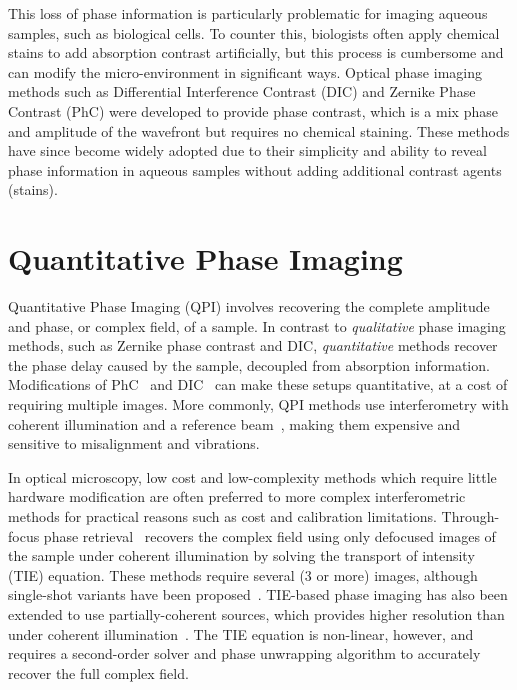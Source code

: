 This loss of phase information is particularly problematic for imaging aqueous samples, such as biological cells. To counter this, biologists often apply chemical stains to add absorption contrast artificially, but this process is cumbersome and can modify the micro-environment in significant ways. Optical phase imaging methods such as Differential Interference Contrast (DIC)\cite{smithDIC} and Zernike Phase Contrast (PhC) \cite{zernike1955discovered} were developed to provide phase contrast, which is a mix phase and amplitude of the wavefront but requires no chemical staining. These methods have since become widely adopted due to their simplicity and ability to reveal phase information in aqueous samples without adding additional contrast agents (stains).

\section{Quantitative Phase Imaging}
Quantitative Phase Imaging (QPI) involves recovering the complete amplitude and phase, or complex field, of a sample. In contrast to \emph{qualitative} phase imaging methods, such as Zernike phase contrast and DIC, \emph{quantitative} methods recover the phase delay caused by the sample, decoupled from absorption information. Modifications of PhC~\cite{yun2010system} and DIC~\cite{CuiYangTearney2011} can make these setups quantitative, at a cost of requiring multiple images. More commonly, QPI methods use interferometry with coherent illumination and a reference beam~\cite{Wang2011, Popescu2006, Bhaduri:12}, making them expensive and sensitive to misalignment and vibrations.

In optical microscopy, low cost and low-complexity methods which require little hardware modification are often preferred to more complex interferometric methods for practical reasons such as cost and calibration limitations. Through-focus phase retrieval~\cite{waller2010transport, Petruccelli:12, Jingshan14GPTIE} recovers the complex field using only defocused images of the sample under coherent illumination by solving the transport of intensity (TIE) equation. These methods require several (3 or more) images, although single-shot variants have been proposed~\cite{wallerColorTIE}. TIE-based phase imaging has also been extended to use partially-coherent sources, which provides higher resolution than under coherent illumination~\cite{JingsanSourceRecovery2016}. The TIE equation is non-linear, however, and requires a second-order solver and phase unwrapping algorithm to accurately recover the full complex field.

